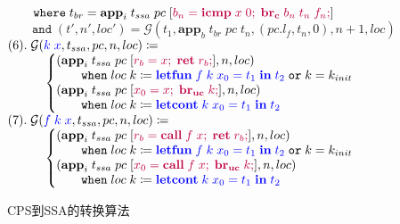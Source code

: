 \begin{figure}[!ht]
\begin{algorithm}[H]
        $ \quad\quad \mathtt{where}\; t_{br} = \mathbf{app}_i\; t_{ssa}\; pc\; [\textcolor{purple}{b_n=\mathbf{icmp}\; x\; 0;\; \mathbf{br_c}\; b_n\; t_n\; f_n;}]  $ \\
        $ \quad\quad \mathtt{and}\; (t', n', loc') = \mathbf{\mathcal{G}}(t_1, \mathbf{app}_b\; t_{br}\; pc\; t_n, (pc.l_f, t_n, 0), n+1, loc) $ \\
        $ (6).\; \mathbf{\mathcal{G}}(\textcolor{blue}{k\; x}, t_{ssa}, pc, n, loc) \coloneqq $\\
        $\quad\quad\quad \left\{ 
        \begin{aligned}
            & (\mathbf{app}_i\; t_{ssa}\; pc\; [\textcolor{purple}{r_b = x;\; \mathbf{ret}\; r_b;}], n, loc) \\[-3pt]
            & \quad\quad \mathtt{when}\; loc\; k \coloneqq \textcolor{blue}{\mathbf{letfun}\; f\; k\; x_0=t_1\; \mathbf{in}\; t_2}\; \mathtt{or}\; k=k_{init} \\[-3pt]
            & (\mathbf{app}_i\; t_{ssa}\; pc\; [\textcolor{purple}{x_0 = x;\; \mathbf{br_{uc}}\; k;}], n, loc) \\[-3pt]
            & \quad\quad \mathtt{when}\; loc\; k \coloneqq \textcolor{blue}{\mathbf{letcont}\; k\; x_0=t_1\; \mathbf{in}\; t_2} \\
        \end{aligned}
        \right. $\\
        $ (7).\; \mathbf{\mathcal{G}}(\textcolor{blue}{f\; k\; x}, t_{ssa}, pc, n, loc) \coloneqq $ \\
        $\quad\quad\quad  \left\{ 
            \begin{aligned}
        & (\mathbf{app}_i\; t_{ssa}\; pc\; [\textcolor{purple}{r_b = \mathbf{call}\; f\; x;\; \mathbf{ret}\; r_b;}], n, loc) \\[-3pt]
        & \quad\quad \mathtt{when}\; loc\; k \coloneqq \textcolor{blue}{\mathbf{letfun}\; f\; k\; x_0=t_1\; \mathbf{in}\; t_2}\; \mathtt{or}\; k=k_{init} \\[-3pt]
        & (\mathbf{app}_i\; t_{ssa}\; pc\; [\textcolor{purple}{x_0 = \mathbf{call}\; f\; x;\; \mathbf{br_{uc}}\; k;}], n, loc) \\[-3pt]      
        & \quad\quad \mathtt{when}\; loc\; k \coloneqq \textcolor{blue}{\mathbf{letcont}\; k\; x_0=t_1\; \mathbf{in}\; t_2} \\
            \end{aligned}
        \right. $\\
    \end{algorithm}
    \caption{CPS到SSA的转换算法}\label{cps2ssa}
\end{figure}

